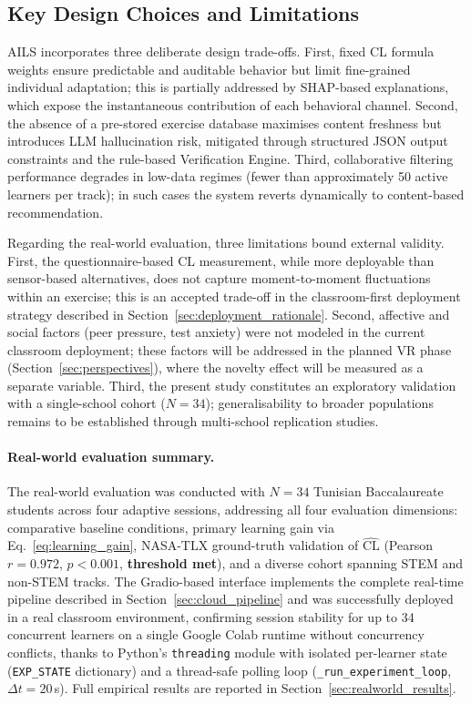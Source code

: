 \documentclass[ASNA,twocolumn]{USG} %
\begin{document}
\subsection{Key Design Choices and Limitations}

AILS incorporates three deliberate design trade-offs.
First, fixed CL formula weights ensure predictable and auditable
behavior but limit fine-grained individual adaptation; this is
partially addressed by SHAP-based explanations, which expose the
instantaneous contribution of each behavioral channel.
Second, the absence of a pre-stored exercise database maximises
content freshness but introduces LLM hallucination risk, mitigated
through structured JSON output constraints and the rule-based
Verification Engine.
Third, collaborative filtering performance degrades in low-data
regimes (fewer than approximately 50 active learners per track);
in such cases the system reverts dynamically to content-based
recommendation.

Regarding the real-world evaluation, three limitations bound external
validity. First, the questionnaire-based CL measurement, while more
deployable than sensor-based alternatives, does not capture
moment-to-moment fluctuations within an exercise; this is an accepted
trade-off in the classroom-first deployment strategy described in
Section~\ref{sec:deployment_rationale}. Second, affective
and social factors (peer pressure, test anxiety) were
not modeled in the current classroom deployment; these factors will
be addressed in the planned VR phase
(Section~\ref{sec:perspectives}), where the novelty effect
will be measured as a separate variable. Third, the present study
constitutes an exploratory validation with a single-school cohort
($N{=}34$); generalisability to broader populations remains to be
established through multi-school replication studies.

\paragraph{Real-world evaluation summary.}
The real-world evaluation was conducted with $N{=}34$ Tunisian
Baccalaureate students across four adaptive sessions, addressing all
four evaluation dimensions: comparative baseline conditions, primary
learning gain via Eq.~\eqref{eq:learning_gain}, NASA-TLX ground-truth
validation of $\widehat{\text{CL}}$ (Pearson $r{=}0.972$,
$p{<}0.001$, \textbf{threshold met}), and a diverse cohort spanning
STEM and non-STEM tracks.
The Gradio-based interface implements the complete real-time pipeline
described in Section~\ref{sec:cloud_pipeline} and was successfully
deployed in a real classroom environment, confirming session stability
for up to 34 concurrent learners on a single Google Colab runtime
without concurrency conflicts, thanks to Python's \texttt{threading}
module with isolated per-learner state (\texttt{EXP\_STATE}
dictionary) and a thread-safe polling loop
(\texttt{\_run\_experiment\_loop}, $\Delta t{=}20$\,s).
Full empirical results are reported in
Section~\ref{sec:realworld_results}.
\end{document}
